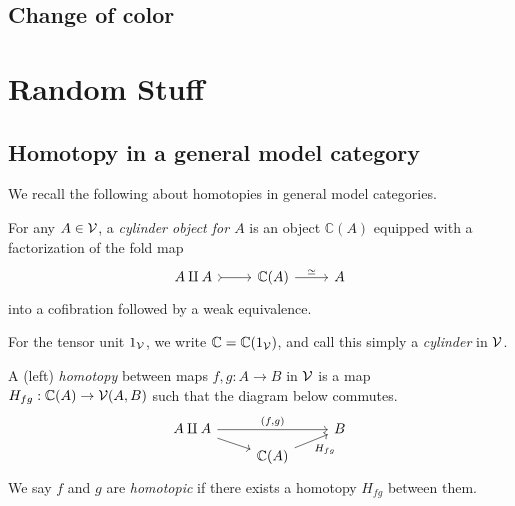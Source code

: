 \documentclass[a4paper,10pt
,draft
]{article}%
\renewcommand{\1}{\eta}%
\begin{document}
\subsection{Change of color}




\section{Random Stuff}


\subsection{Homotopy in a general model category}

We recall the following about homotopies in general model categories.
\begin{definition}
      For any $A \in \mathcal V$, a \textit{cylinder object for $A$} is an object $\mathbb C(A)$ equipped with a factorization of the fold map
      \begin{equation}
            \begin{tikzcd}
                  A \amalg A \arrow[r, tail]
                  &
                  \mathbb C(A) \arrow[r, "\simeq"]
                  &
                  A
            \end{tikzcd}
      \end{equation}
      into a cofibration followed by a weak equivalence.
      
      For the tensor unit $1_{\mathcal V}$, we write $\mathbb C = \mathbb C(1_{\mathcal V})$, and call this simply a \textit{cylinder} in $\mathcal V$.
      
      A (left) \textit{homotopy} between maps $f,g: A \to B$ in $\mathcal V$ is a map $H_{fg}: \mathbb C(A) \to \mathcal V(A,B)$ such that
      the diagram below commutes.
      \begin{equation}
            \begin{tikzcd}[row sep = tiny]
                  A \amalg A \arrow[rr, "{(f,g)}"] \arrow[dr]
                  &&
                  B
                  \\
                  &
                  \mathbb C(A) \arrow[ur, "H_{fg}"']
            \end{tikzcd}
      \end{equation}
      We say $f$ and $g$ are \textit{homotopic} if there exists a homotopy $H_{f g}$ between them.
\end{definition}
\end{document}
